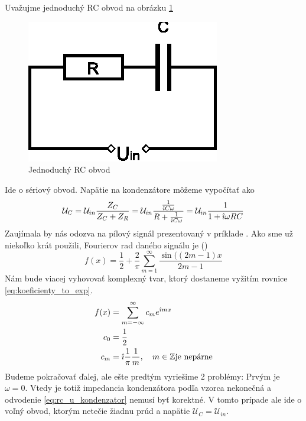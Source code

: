 Uvažujme jednoduchý RC obvod na obrázku \ref{fig:rc_obvod}

\begin{figure}[htp]
    \centering
    \includegraphics{obrazky/fyzika/rlc/rc_obvod}
    \caption{Jednoduchý RC obvod}
    \label{fig:rc_obvod}
\end{figure}

Ide o sériový obvod. Napätie na kondenzátore môžeme vypočítať
ako
\begin{equation}
    \mathcal{U}_C = \mathcal{U}_{in} \frac{Z_C}{Z_C+Z_R} =
            \mathcal{U}_{in} \frac{\frac{1}{\hat{\imath} C \omega}}{
                R + \frac{1}{\hat{\imath} C \omega}} = 
                \mathcal{U}_{in} \frac{1}{1 + \hat{\imath} \omega RC}
    \label{eq:rc_u_kondenzator}
\end{equation}
Zaujímala by nás odozva na pílový signál prezentovaný v príklade
. Ako sme už niekoľko krát použili, Fourierov rad daného
signálu je ()
\begin{equation}
    f(x) = \frac{1}{2} + \frac{2}{\pi} 
        \sum_{m=1}^{\infty} \frac{\sin((2m-1)x}{2m-1}
\end{equation}
Nám bude viacej vyhovovať komplexný tvar, ktorý dostaneme vyžitím
rovnice \ref{eq:koeficienty_to_exp}.
\begin{align}
    f(x) &= \sum_{m=-\infty}^{\infty} c_m e^{\hat{\imath} m x} \\
    c_0 &= \frac{1}{2} \\
    c_m &= \hat{\imath} \frac{1}{\pi} \frac{1}{m}, \quad m\in \mathbb{Z} 
        \text{je nepárne}
\end{align}
Budeme pokračovať ďalej, ale ešte predtým vyriešime 2 problémy:
Prvým je
$\omega=0$. Vtedy je totiž impedancia kondenzátora podľa vzorca
nekonečná a odvodenie \ref{eq:rc_u_kondenzator} nemusí byť korektné.
V tomto prípade ale ide o voľný obvod, ktorým netečie žiadnu prúd a
napätie $\mathcal{U}_C = \mathcal{U}_{in}$.

